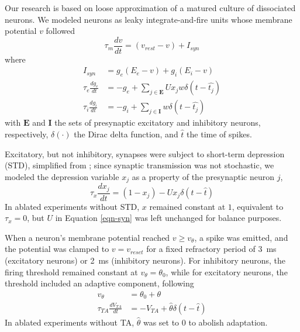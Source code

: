 \documentclass[pdflatex,referee,iicol,sn-basic]{sn-jnl}
\theoremstyle{thmstyleone}%
\theoremstyle{thmstyletwo}%
\theoremstyle{thmstylethree}%
\begin{document}
Our research is based on loose approximation of a matured culture of dissociated neurons. We modeled neurons as leaky integrate-and-fire units whose membrane potential $v$ followed
\begin{equation}
    \tau_m \frac{dv}{dt} = (v_{rest}-v) + I_{syn}
\end{equation}
where
\begin{align}
    I_{syn} &= g_e(E_e-v) + g_i(E_i-v) \nonumber \\
    \tau_e \frac{dg_e}{dt} &= -g_e + \sum_{j \in \boldsymbol E} U x_j w \delta(t - \hat{t_j}) \nonumber \\
    \tau_i \frac{dg_i}{dt} &= -g_i + \sum_{j \in \boldsymbol I} w \delta(t - \hat{t_j}) \label{eqn-syn}
\end{align}
with $\boldsymbol E$ and $\boldsymbol I$ the sets of presynaptic excitatory and inhibitory neurons, respectively, $\delta(\cdot)$ the Dirac delta function, and $\hat{t}$ the time of spikes.

Excitatory, but not inhibitory, synapses were subject to short-term depression (STD), simplified from \cite{Tsodyks1997-qt}; since synaptic transmission was not stochastic, we modeled the depression variable $x_j$ as a property of the presynaptic neuron $j$,
\begin{equation}
    \tau_x \frac{dx_j}{dt} = (1-x_j) - U x_j \delta(t - \hat{t})
\end{equation}
In ablated experiments without STD, $x$ remained constant at $1$, equivalent to $\tau_x = 0$, but $U$ in Equation \ref{eqn-syn} was left unchanged for balance purposes.

When a neuron's membrane potential reached $v \geq v_\theta$, a spike was emitted, and the potential was clamped to $v = v_{reset}$ for a fixed refractory period of 3~ms (excitatory neurons) or 2~ms (inhibitory neurons). For inhibitory neurons, the firing threshold remained constant at $v_\theta = \theta_0$, while for excitatory neurons, the threshold included an adaptive component, following
\begin{align}
    v_\theta &= \theta_0 + \theta \nonumber \\
    \tau_{TA} \frac{dV_{TA}}{dt} &= -V_{TA} + \hat{\theta} \delta(t - \hat{t})
\end{align}
In ablated experiments without TA, $\hat{\theta}$ was set to $0$ to abolish adaptation.
\end{document}

